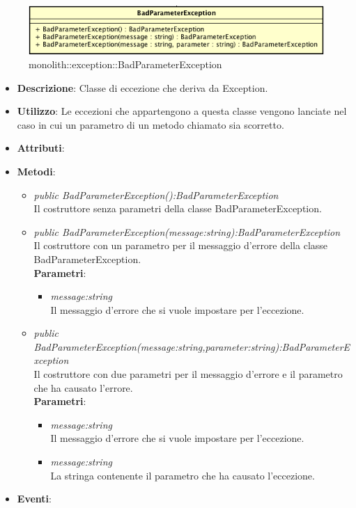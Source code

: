 \label{monolith::exception::BadParameterException}
\begin{figure}[H]
	\centering
	\includegraphics[scale=0.5]{Sezioni/SottosezioniST/img/app/BadParameterException.png}
	\caption{monolith::exception::BadParameterException}
\end{figure}

\begin{itemize}
\item \textbf{Descrizione}: Classe di eccezione che deriva da Exception.
\item \textbf{Utilizzo}: Le eccezioni che appartengono a questa classe vengono lanciate nel caso in cui un parametro di un metodo chiamato sia scorretto.
\item \textbf{Attributi}: 
\item \textbf{Metodi}:
	\begin{itemize}
	\item \textit{public BadParameterException():BadParameterException}\\
	Il costruttore senza parametri della classe BadParameterException.
	\item \textit{public BadParameterException(message:string):BadParameterException}\\
	Il costruttore con un parametro per il messaggio d'errore della classe BadParameterException.
			\\ \textbf{Parametri}: \begin{itemize}
			\item \textit{message:string}\\
			Il messaggio d'errore che si vuole impostare per l'eccezione.
			\end{itemize} 
	\item \textit{public BadParameterException(message:string,parameter:string):BadParameterException}\\
	Il costruttore con due parametri per il messaggio d'errore e il parametro che ha causato l'errore.
			\\ \textbf{Parametri}: \begin{itemize}
			\item \textit{message:string}\\
			Il messaggio d'errore che si vuole impostare per l'eccezione.
			\item \textit{message:string}\\
			La stringa contenente il parametro che ha causato l'eccezione.
			\end{itemize} 
	\end{itemize}
\item \textbf{Eventi}:
\end{itemize}